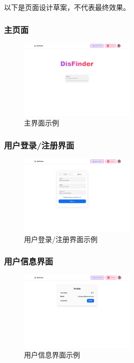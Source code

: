 以下是页面设计草案，不代表最终效果。

\subsubsection{主页面}

\begin{figure}[H]
\centering
\includegraphics[width=0.5\textwidth]{assets/design/homepage.png}
\caption{主界面示例}
\end{figure}

\subsubsection{用户登录/注册界面}

\begin{figure}[H]
\centering
\includegraphics[width=0.5\textwidth]{assets/design/authpage.png}
\caption{用户登录/注册界面示例}
\end{figure}

\subsubsection{用户信息界面}

\begin{figure}[H]
\centering
\includegraphics[width=0.5\textwidth]{assets/design/userpage.png}
\caption{用户信息界面示例}
\end{figure}

